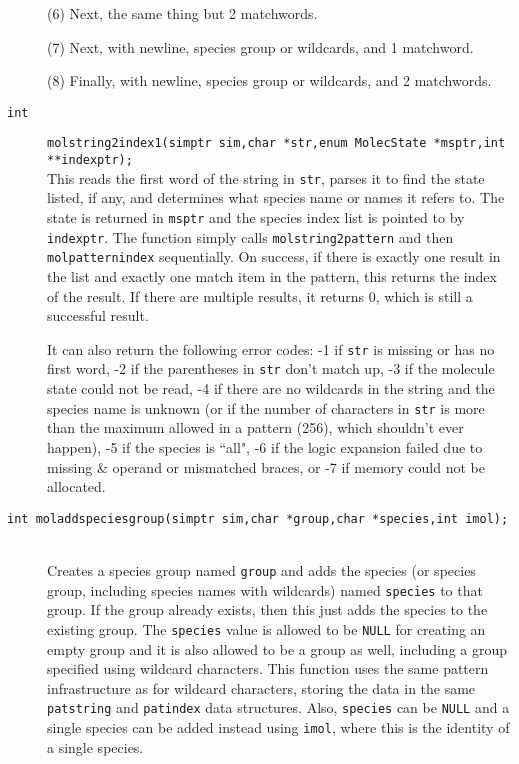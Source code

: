 \documentclass {scrbook}
\newcommand {\ttt} {\texttt}
\begin{document}
\begin{description}
(6) Next, the same thing but 2 matchwords.

(7) Next, with newline, species group or wildcards, and 1 matchword.

(8) Finally, with newline, species group or wildcards, and 2 matchwords.

\item[\ttt{int}]
\ttt{molstring2index1(simptr sim,char *str,enum MolecState *msptr,int **indexptr);}
\hfill \\
This reads the first word of the string in \ttt{str}, parses it to find the state listed, if any, and determines what species name or names it refers to. The state is returned in \ttt{msptr} and the species index list is pointed to by \ttt{indexptr}. The function simply calls \ttt{molstring2pattern} and then \ttt{molpatternindex} sequentially. On success, if there is exactly one result in the list and exactly one match item in the pattern, this returns the index of the result. If there are multiple results, it returns 0, which is still a successful result.

It can also return the following error codes: -1 if \ttt{str} is missing or has no first word, -2 if the parentheses in \ttt{str} don't match up, -3 if the molecule state could not be read, -4 if there are no wildcards in the string and the species name is unknown (or if the number of characters in \ttt{str} is more than the maximum allowed in a pattern (256), which shouldn't ever happen), -5 if the species is ``all", -6 if the logic expansion failed due to missing \& operand or mismatched braces, or -7 if memory could not be allocated.

\item[\ttt{int moladdspeciesgroup(simptr sim,char *group,char *species,int imol);}]
\hfill \\
Creates a species group named \ttt{group} and adds the species (or species group, including species names with wildcards) named \ttt{species} to that group. If the group already exists, then this just adds the species to the existing group. The \ttt{species} value is allowed to be \ttt{NULL} for creating an empty group and it is also allowed to be a group as well, including a group specified using wildcard characters. This function uses the same pattern infrastructure as for wildcard characters, storing the data in the same \ttt{patstring} and \ttt{patindex} data structures. Also, \ttt{species} can be \ttt{NULL} and a single species can be added instead using \ttt{imol}, where this is the identity of a single species.


\end{description}
\end{document}
